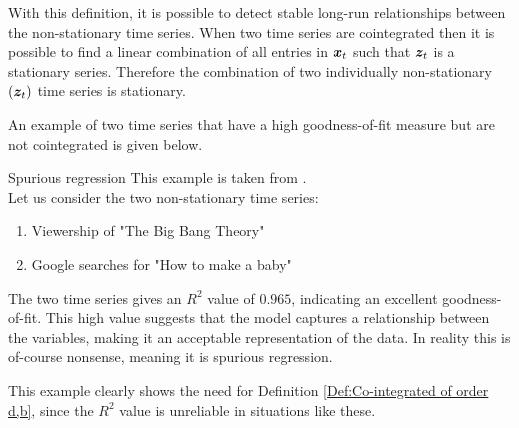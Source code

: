 \noindent With this definition, it is possible to detect stable long-run relationships between the non-stationary time series. When two time series are cointegrated then it is possible to find a linear combination of all entries in $\boldsymbol{x}_t$ such that $\boldsymbol{z}_t$ is a stationary series. Therefore the combination of two individually non-stationary $(\boldsymbol{z}_t)$ time series is stationary.
 



\noindent An example of two time series that have a high goodness-of-fit measure but are not cointegrated is given below. 
\begin{ekse}{Spurious regression}
This example is taken from \cite{Spurious_example}.\\
    Let us consider the two non-stationary time series:
    \begin{enumerate}
        \item Viewership of "The Big Bang Theory"
        \item Google searches for "How to make a baby"
    \end{enumerate}
  The two time series gives an $R^2$ value of $0.965$, indicating an excellent goodness-of-fit. This high value suggests that the model captures a relationship between the variables, making it an acceptable representation of the data. In reality this is of-course nonsense, meaning it is spurious regression.
\end{ekse}
\noindent This example clearly shows the need for Definition \ref{Def:Co-integrated of order d,b}, since the $R^2$ value is unreliable in situations like these.
\begin{comment}
\begin{defi}{Error Correction}
    A vector time series $x_t$ can be expressed using error correction if it can be written as:
    \begin{align*}
        A(B)(1-B)x_t=-\gamma z_{t_{t-1}}+u_t
    \end{align*}
    where $u_t$ is a stationary multivariate disturbance, $A(0)=I$, $A(1)$ has all elements finite, $z_\tau=\alpha^Tx_\tau$ and $\gamma\neq0$.
\end{defi}
Definition from \cite{co-Integration_and_error_correction}
The error correction model is a tool used when 
\end{comment}

